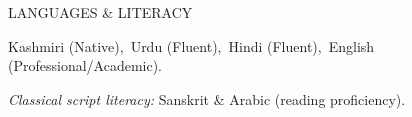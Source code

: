 

\begin{rubric}{LANGUAGES \& LITERACY}

\entry*[Languages]
  Kashmiri (Native),\ Urdu (Fluent),\ Hindi (Fluent),\ English (Professional/Academic).
  \par \textit{Classical script literacy:} Sanskrit \& Arabic (reading proficiency).

\end{rubric}